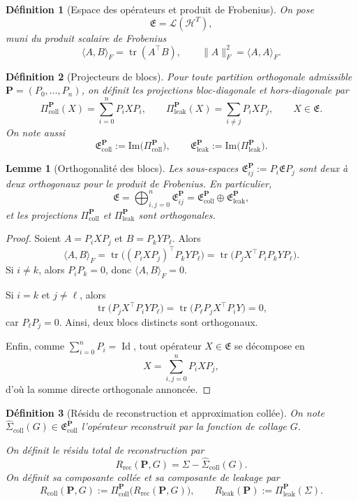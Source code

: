 \documentclass[11pt,a4paper]{article}
\newtheorem{definition}{Définition}[section]
\newtheorem{lemma}{Lemme}[section]
\DeclareMathOperator{\Id}{Id}
\DeclareMathOperator{\tr}{tr}
\newcommand{\Hh}{\mathcal H}
\newcommand{\1}{\mathbf 1}
\begin{document}
\begin{definition}[Espace des opérateurs et produit de Frobenius]
On pose
\[
\mathfrak E=\mathcal L(\Hh^T),
\]
muni du produit scalaire de Frobenius
\[
\langle A,B\rangle_F=\tr(A^\top B),
\qquad
\|A\|_F^2=\langle A,A\rangle_F.
\]
\end{definition}

\begin{definition}[Projecteurs de blocs]
Pour toute partition orthogonale admissible \(\mathbf P=(P_0,\dots,P_n)\), on définit les projections
bloc-diagonale et hors-diagonale par
\[
\Pi_{\mathrm{coll}}^{\mathbf P}(X)
=
\sum_{i=0}^n P_iXP_i,
\qquad
\Pi_{\mathrm{leak}}^{\mathbf P}(X)
=
\sum_{i\neq j}P_iXP_j,
\qquad
X\in\mathfrak E.
\]
On note aussi
\[
\mathfrak E_{\mathrm{coll}}^{\mathbf P}:=\mathrm{Im}\bigl(\Pi_{\mathrm{coll}}^{\mathbf P}\bigr),
\qquad
\mathfrak E_{\mathrm{leak}}^{\mathbf P}:=\mathrm{Im}\bigl(\Pi_{\mathrm{leak}}^{\mathbf P}\bigr).
\]
\end{definition}

\begin{lemma}[Orthogonalité des blocs]
Les sous-espaces \(\mathfrak E_{ij}^{\mathbf P}:=P_i\mathfrak E P_j\) sont deux à deux orthogonaux pour le produit de Frobenius.
En particulier,
\[
\mathfrak E
=
\bigoplus_{i,j=0}^n \mathfrak E_{ij}^{\mathbf P}
=
\mathfrak E_{\mathrm{coll}}^{\mathbf P}\oplus \mathfrak E_{\mathrm{leak}}^{\mathbf P},
\]
et les projections \(\Pi_{\mathrm{coll}}^{\mathbf P}\) et \(\Pi_{\mathrm{leak}}^{\mathbf P}\) sont orthogonales.
\end{lemma}

\begin{proof}
Soient \(A=P_iXP_j\) et \(B=P_kYP_\ell\). Alors
\[
\langle A,B\rangle_F
=
\tr\!\bigl((P_iXP_j)^\top P_kYP_\ell\bigr)
=
\tr\!\bigl(P_jX^\top P_iP_kYP_\ell\bigr).
\]
Si \(i\neq k\), alors \(P_iP_k=0\), donc \(\langle A,B\rangle_F=0\).

Si \(i=k\) et \(j\neq \ell\), alors
\[
\tr\!\bigl(P_jX^\top P_iYP_\ell\bigr)
=
\tr\!\bigl(P_\ell P_jX^\top P_iY\bigr)=0,
\]
car \(P_\ell P_j=0\). Ainsi, deux blocs distincts sont orthogonaux.

Enfin, comme \(\sum_{i=0}^n P_i=\Id\), tout opérateur \(X\in\mathfrak E\) se décompose en
\[
X=\sum_{i,j=0}^n P_iXP_j,
\]
d'où la somme directe orthogonale annoncée.
\end{proof}

\begin{definition}[Résidu de reconstruction et approximation collée]
On note \(\widehat \Sigma_{\mathrm{coll}}(G)\in\mathfrak E_{\mathrm{coll}}^{\mathbf P}\) l'opérateur reconstruit par la fonction de collage \(G\).

On définit le résidu total de reconstruction par
\[
R_{\mathrm{rec}}(\mathbf P,G)
=
\Sigma-\widehat \Sigma_{\mathrm{coll}}(G).
\]
On définit sa composante collée et sa composante de leakage par
\[
R_{\mathrm{coll}}(\mathbf P,G)
:=
\Pi_{\mathrm{coll}}^{\mathbf P}\!\bigl(R_{\mathrm{rec}}(\mathbf P,G)\bigr),
\qquad
R_{\mathrm{leak}}(\mathbf P)
:=
\Pi_{\mathrm{leak}}^{\mathbf P}(\Sigma).
\]
\end{definition}
\end{document}
